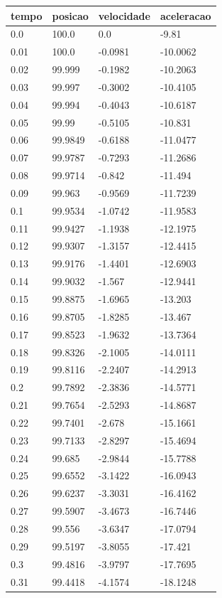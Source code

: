 \begin{tabular}{llll}
\toprule
tempo & posicao & velocidade & aceleracao \\
\midrule
0.0 & 100.0 & 0.0 & -9.81 \\
0.01 & 100.0 & -0.0981 & -10.0062 \\
0.02 & 99.999 & -0.1982 & -10.2063 \\
0.03 & 99.997 & -0.3002 & -10.4105 \\
0.04 & 99.994 & -0.4043 & -10.6187 \\
0.05 & 99.99 & -0.5105 & -10.831 \\
0.06 & 99.9849 & -0.6188 & -11.0477 \\
0.07 & 99.9787 & -0.7293 & -11.2686 \\
0.08 & 99.9714 & -0.842 & -11.494 \\
0.09 & 99.963 & -0.9569 & -11.7239 \\
0.1 & 99.9534 & -1.0742 & -11.9583 \\
0.11 & 99.9427 & -1.1938 & -12.1975 \\
0.12 & 99.9307 & -1.3157 & -12.4415 \\
0.13 & 99.9176 & -1.4401 & -12.6903 \\
0.14 & 99.9032 & -1.567 & -12.9441 \\
0.15 & 99.8875 & -1.6965 & -13.203 \\
0.16 & 99.8705 & -1.8285 & -13.467 \\
0.17 & 99.8523 & -1.9632 & -13.7364 \\
0.18 & 99.8326 & -2.1005 & -14.0111 \\
0.19 & 99.8116 & -2.2407 & -14.2913 \\
0.2 & 99.7892 & -2.3836 & -14.5771 \\
0.21 & 99.7654 & -2.5293 & -14.8687 \\
0.22 & 99.7401 & -2.678 & -15.1661 \\
0.23 & 99.7133 & -2.8297 & -15.4694 \\
0.24 & 99.685 & -2.9844 & -15.7788 \\
0.25 & 99.6552 & -3.1422 & -16.0943 \\
0.26 & 99.6237 & -3.3031 & -16.4162 \\
0.27 & 99.5907 & -3.4673 & -16.7446 \\
0.28 & 99.556 & -3.6347 & -17.0794 \\
0.29 & 99.5197 & -3.8055 & -17.421 \\
0.3 & 99.4816 & -3.9797 & -17.7695 \\
0.31 & 99.4418 & -4.1574 & -18.1248 \\

\end{tabular}
